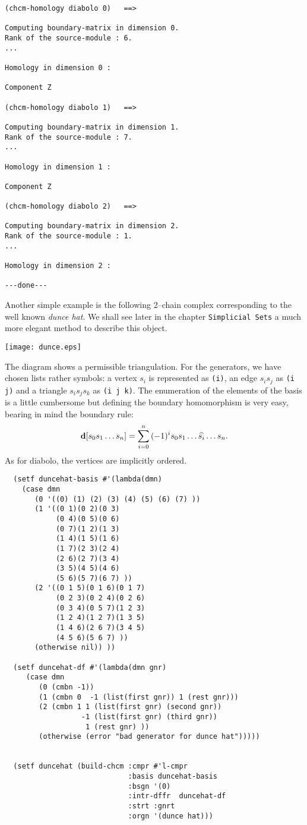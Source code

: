 {\footnotesize\begin{verbatim}
(chcm-homology diabolo 0)   ==>

Computing boundary-matrix in dimension 0.
Rank of the source-module : 6.
...

Homology in dimension 0 :

Component Z

(chcm-homology diabolo 1)   ==>

Computing boundary-matrix in dimension 1.
Rank of the source-module : 7.
...

Homology in dimension 1 :

Component Z

(chcm-homology diabolo 2)   ==>

Computing boundary-matrix in dimension 2.
Rank of the source-module : 1.
...

Homology in dimension 2 :

---done---
\end{verbatim}}
Another simple example is the following  2--chain  complex  corresponding to the
well known {\em dunce hat}. We shall see later in the chapter {\tt Simplicial Sets} a
much more elegant method to describe this object.
%
\vskip 0.40cm
\centerline{\texttt{[image: dunce.eps]}}
\vskip 0.40cm
%
The diagram shows a permissible triangulation. For the generators, we have  chosen lists
rather symbols: a vertex $s_i$ is represented as {\tt (i)}, an edge $s_is_j$ as
{\tt (i j)} and a triangle $s_is_js_k$ as {\tt (i j k)}. The enumeration of
the elements of the basis is a little  cumbersome but defining  the
boundary homomorphism is very easy, bearing in mind the boundary rule:
$$ {\bf d}[s_0s_1\ldots s_n] = \sum_{i=0}^n{(-1)^is_0s_1\ldots\widehat{s_i}\ldots s_n}.$$
As for diabolo, the vertices are  implicitly ordered.
{\footnotesize\begin{verbatim}
  (setf duncehat-basis #'(lambda(dmn)
    (case dmn
       (0 '((0) (1) (2) (3) (4) (5) (6) (7) ))
       (1 '((0 1)(0 2)(0 3)
            (0 4)(0 5)(0 6)
            (0 7)(1 2)(1 3)
            (1 4)(1 5)(1 6)
            (1 7)(2 3)(2 4)
            (2 6)(2 7)(3 4)
            (3 5)(4 5)(4 6)
            (5 6)(5 7)(6 7) ))
       (2 '((0 1 5)(0 1 6)(0 1 7)
            (0 2 3)(0 2 4)(0 2 6)
            (0 3 4)(0 5 7)(1 2 3)
            (1 2 4)(1 2 7)(1 3 5)
            (1 4 6)(2 6 7)(3 4 5)
            (4 5 6)(5 6 7) ))
       (otherwise nil)) ))

  (setf duncehat-df #'(lambda(dmn gnr)
     (case dmn
        (0 (cmbn -1))
        (1 (cmbn 0  -1 (list(first gnr)) 1 (rest gnr)))
        (2 (cmbn 1 1 (list(first gnr) (second gnr))
                  -1 (list(first gnr) (third gnr))
                   1 (rest gnr) ))
        (otherwise (error "bad generator for dunce hat")))))


  (setf duncehat (build-chcm :cmpr #'l-cmpr
                             :basis duncehat-basis
                             :bsgn '(0)
                             :intr-dffr  duncehat-df
                             :strt :gnrt
                             :orgn '(dunce hat)))
\end{verbatim}}
